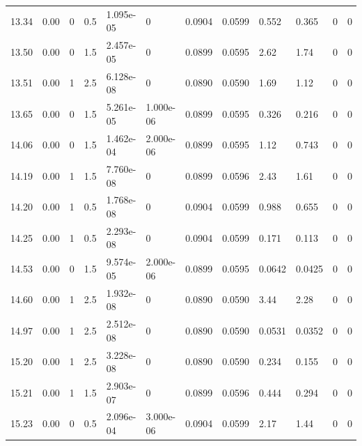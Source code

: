 \documentclass[preview]{standalone}
\begin{document}
{{{\begin{tabular}{L{1.2cm}C{1.2cm} C{0.3cm}C{0.5cm} C{1.4cm}C{1.4cm} C{1.4cm}C{1.4cm} C{1.6cm}C{1.6cm} C{1.6cm}C{1.6cm}}
  13.34  &  0.00  & 0     & 0.5 &  1.095e-05  & 0  &  0.0904&   0.0599& 0.552 & 0.365   &  0 & 0  \\ 
  13.50  &  0.00  & 0     & 1.5 &  2.457e-05  & 0  &  0.0899&   0.0595& 2.62 & 1.74   &  0 & 0  \\ 
  13.51  &  0.00  & 1     & 2.5 &  6.128e-08  & 0  &  0.0890&   0.0590& 1.69 & 1.12   &  0 & 0  \\ 
  13.65  &  0.00  & 0     & 1.5 &  5.261e-05  & 1.000e-06  &  0.0899&   0.0595& 0.326 & 0.216   &  0 & 0  \\ 
  14.06  &  0.00  & 0     & 1.5 &  1.462e-04  & 2.000e-06  &  0.0899&   0.0595& 1.12 & 0.743   &  0 & 0  \\ 
  14.19  &  0.00  & 1     & 1.5 &  7.760e-08  & 0  &  0.0899&   0.0596& 2.43 & 1.61   &  0 & 0  \\ 
  14.20  &  0.00  & 1     & 0.5 &  1.768e-08  & 0  &  0.0904&   0.0599& 0.988 & 0.655   &  0 & 0  \\ 
  14.25  &  0.00  & 1     & 0.5 &  2.293e-08  & 0  &  0.0904&   0.0599& 0.171 & 0.113   &  0 & 0  \\ 
  14.53  &  0.00  & 0     & 1.5 &  9.574e-05  & 2.000e-06  &  0.0899&   0.0595& 0.0642 & 0.0425   &  0 & 0  \\ 
  14.60  &  0.00  & 1     & 2.5 &  1.932e-08  & 0  &  0.0890&   0.0590& 3.44 & 2.28   &  0 & 0  \\ 
  14.97  &  0.00  & 1     & 2.5 &  2.512e-08  & 0  &  0.0890&   0.0590& 0.0531 & 0.0352   &  0 & 0  \\ 
  15.20  &  0.00  & 1     & 2.5 &  3.228e-08  & 0  &  0.0890&   0.0590& 0.234 & 0.155   &  0 & 0  \\ 
  15.21  &  0.00  & 1     & 1.5 &  2.903e-07  & 0  &  0.0899&   0.0596& 0.444 & 0.294   &  0 & 0  \\ 
  15.23  &  0.00  & 0     & 0.5 &  2.096e-04  & 3.000e-06  &  0.0904&   0.0599& 2.17 & 1.44   &  0 & 0  \\ 
\hline 
\end{tabular} 

}}}
\end{document}

